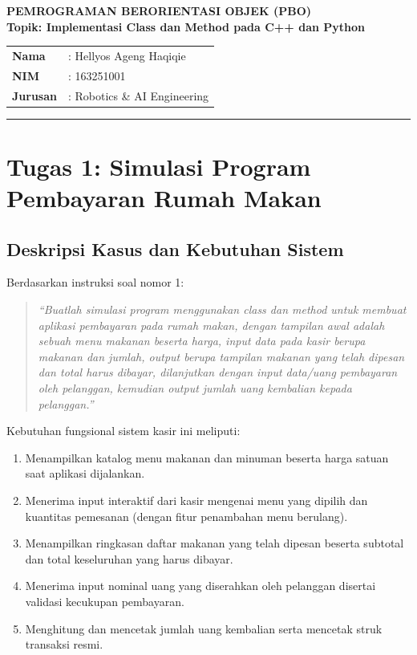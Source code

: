 \documentclass[12pt,a4paper]{article}
\begin{document}
\begin{center}
    {\Large \textbf{PEMROGRAMAN BERORIENTASI OBJEK (PBO)}}\\[0.2cm]
    {\large \textbf{Topik: Implementasi Class dan Method pada C++ dan Python}}\\[0.4cm]
    \begin{tabular}{ll}
        \textbf{Nama}    & : Hellyos Ageng Haqiqie \\
        \textbf{NIM}     & : 163251001 \\
        \textbf{Jurusan} & : Robotics \& AI Engineering \\
    \end{tabular}
\end{center}
\vspace{0.1cm}
\hrule
\vspace{0.6cm}

\section{Tugas 1: Simulasi Program Pembayaran Rumah Makan}

\subsection{Deskripsi Kasus dan Kebutuhan Sistem}
Berdasarkan instruksi soal nomor 1:
\begin{quote}
\textit{``Buatlah simulasi program menggunakan class dan method untuk membuat aplikasi pembayaran pada rumah makan, dengan tampilan awal adalah sebuah menu makanan beserta harga, input data pada kasir berupa makanan dan jumlah, output berupa tampilan makanan yang telah dipesan dan total harus dibayar, dilanjutkan dengan input data/uang pembayaran oleh pelanggan, kemudian output jumlah uang kembalian kepada pelanggan.''}
\end{quote}

Kebutuhan fungsional sistem kasir ini meliputi:
\begin{enumerate}
    \item Menampilkan katalog menu makanan dan minuman beserta harga satuan saat aplikasi dijalankan.
    \item Menerima input interaktif dari kasir mengenai menu yang dipilih dan kuantitas pemesanan (dengan fitur penambahan menu berulang).
    \item Menampilkan ringkasan daftar makanan yang telah dipesan beserta subtotal dan total keseluruhan yang harus dibayar.
    \item Menerima input nominal uang yang diserahkan oleh pelanggan disertai validasi kecukupan pembayaran.
    \item Menghitung dan mencetak jumlah uang kembalian serta mencetak struk transaksi resmi.
\end{enumerate}
\end{document}
